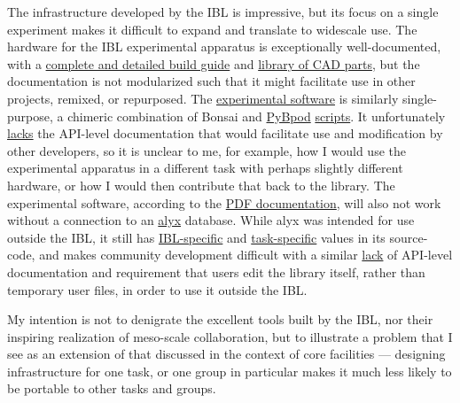 \documentclass[11pt]{article}
\begin{document}
\begin{multicols}{2}
The infrastructure developed by the IBL is impressive, but its focus on
a single experiment makes it difficult to expand and translate to
widescale use. The hardware for the IBL experimental apparatus is
exceptionally well-documented, with a
\href{https://figshare.com/articles/preprint/A_standardized_and_reproducible_method_to_measure_decision-making_in_mice_Appendix_3_IBL_protocol_for_setting_up_the_behavioral_training_rig/11634732}{complete
and detailed build guide} and
\href{https://figshare.com/articles/online_resource/A_standardized_and_reproducible_method_to_measure_decision-making_in_mice_CAD_files_for_behavior_rig/11639973}{library
of CAD parts}, but the documentation is not modularized such that it
might facilitate use in other projects, remixed, or repurposed. The
\href{https://github.com/int-brain-lab/iblrig}{experimental software} is
similarly single-purpose, a chimeric combination of Bonsai \cite{lopesBonsaiEventbasedFramework2015}  and
\href{https://github.com/pybpod/pybpod}{PyBpod}
\href{https://github.com/int-brain-lab/iblrig/tree/master/tasks/_iblrig_tasks_ephysChoiceWorld}{scripts}.
It unfortunately
\href{https://iblrig.readthedocs.io/en/latest/index.html}{lacks} the
API-level documentation that would facilitate use and modification by
other developers, so it is unclear to me, for example, how I would use
the experimental apparatus in a different task with perhaps slightly
different hardware, or how I would then contribute that back to the
library. The experimental software, according to the
\href{https://figshare.com/articles/preprint/A_standardized_and_reproducible_method_to_measure_decision-making_in_mice_Appendix_3_IBL_protocol_for_setting_up_the_behavioral_training_rig/11634732}{PDF
documentation}, will also not work without a connection to an
\href{https://github.com/cortex-lab/alyx}{alyx} database. While alyx was
intended for use outside the IBL, it still has
\href{https://github.com/cortex-lab/alyx/blob/07f481f6bbde668b81ad2634f4c42df4d6a74e44/alyx/data/management/commands/files.py\#L188}{IBL-specific}
and
\href{https://github.com/cortex-lab/alyx/blob/07f481f6bbde668b81ad2634f4c42df4d6a74e44/alyx/data/fixtures/data.datasettype.json\#L29}{task-specific}
values in its source-code, and makes community development difficult
with a similar \href{https://alyx.readthedocs.io/en/latest/}{lack} of
API-level documentation and requirement that users edit the library
itself, rather than temporary user files, in order to use it outside the
IBL.

My intention is not to denigrate the excellent tools built by the IBL,
nor their inspiring realization of meso-scale collaboration, but to
illustrate a problem that I see as an extension of that discussed in the
context of core facilities --- designing infrastructure for one task, or
one group in particular makes it much less likely to be portable to
other tasks and groups.


\end{multicols}
\end{document}
